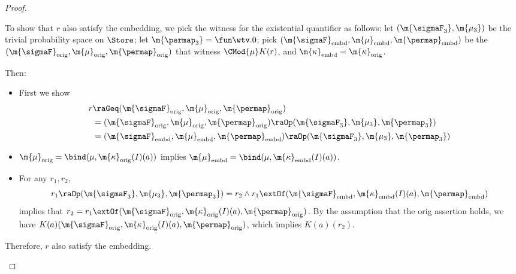 \begin{proof}
\begin{itemize}
										To show that $r$ also satisfy the embedding,
										we pick the witness for the existential quantifier as follows:
										let $(\m{\sigmaF_3}, \m{\mu_3})$ be the trivial probability space on
										$\Store$;
										let $\m{\permap_3} = \fun \wtv. 0$;
										pick $(\m{\sigmaF}_{\text{embd}}, \m{\mu}_{\text{embd}}, \m{\permap}_{\text{embd}})$
										be the $(\m{\sigmaF}_{\text{orig}}, \m{\mu}_{\text{orig}}, \m{\permap}_{\text{orig}})$
										that witness $\CMod{\mu} K (r)$,
										and $\m{\kappa}_{\text{embd}} = \m{\kappa}_{\text{orig}}$.

										Then:
										\begin{itemize}
											\item First we show
												\begin{align*}
													r
													&\raGeq
													(\m{\sigmaF}_{\text{orig}}, \m{\mu}_{\text{orig}}, \m{\permap}_{\text{orig}}) \\
													&= (\m{\sigmaF}_{\text{orig}}, \m{\mu}_{\text{orig}}, \m{\permap}_{\text{orig}}) \raOp (\m{\sigmaF_3}, \m{\mu_3}, \m{\permap_3}) \\
													&= (\m{\sigmaF}_{\text{embd}}, \m{\mu}_{\text{embd}}, \m{\permap}_{\text{embd}}) \raOp (\m{\sigmaF_3}, \m{\mu_3}, \m{\permap_3})
												\end{align*}
\item $\m{\mu}_{\text{orig}} = \bind(\mu, \m{\kappa}_{\text{orig}} (I) (a))$ 
											implies $\m{\mu}_{\text{embd}} = \bind(\mu, \m{\kappa}_{\text{embd}} (I) (a))$.
\item For any $r_1, r_2$,
										\[
											r_1 \raOp (\m{\sigmaF_3}, \m{\mu_3}, \m{\permap_3}) = r_2 \land
											r_1 \extOf (\m{\sigmaF}_{\text{embd}}, \m{\kappa}_{\text{embd}} (I)(a), \m{\permap}_{\text{embd}})
										\]
										implies that $r_2 = r_1 \extOf (\m{\sigmaF}_{\text{orig}}, \m{\kappa}_{\text{orig}} (I)(a), \m{\permap}_{\text{orig}})$.
										By the assumption that the orig assertion holds,
										we have $K(a) (\m{\sigmaF}_{\text{orig}}, \m{\kappa}_{\text{orig}} (I)(a), \m{\permap}_{\text{orig}})$,
                which implies $K(a)(r_2)$.
										\end{itemize}

										Therefore, $r$ also satisfy the embedding.\qedhere
								\end{itemize}
									\end{proof}






